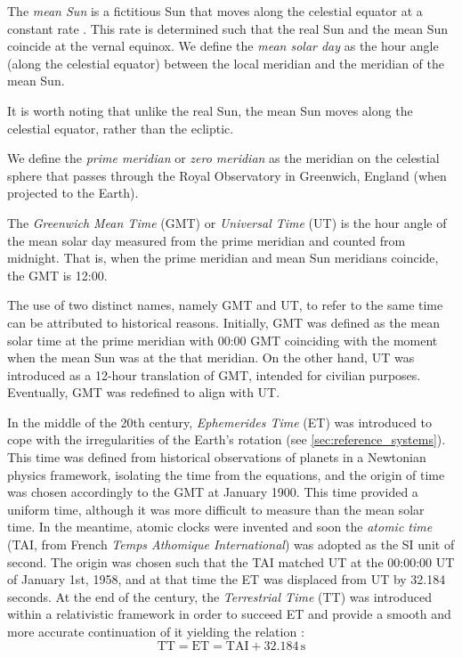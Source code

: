 \documentclass[../main.tex]{subfiles}
\begin{document}
\begin{definition}
  The \emph{mean Sun} is a fictitious Sun that moves along the celestial equator at a constant rate \cite{vallado}. This rate is determined such that the real Sun and the mean Sun coincide at the vernal equinox. We define the \emph{mean solar day} as the hour angle (along the celestial equator) between the local meridian and the meridian of the mean Sun.
\end{definition}
It is worth noting that unlike the real Sun, the mean Sun moves along the celestial equator, rather than the ecliptic.
\begin{definition}
  We define the \emph{prime meridian} or \emph{zero meridian} as the meridian on the celestial sphere that passes through the Royal Observatory in Greenwich, England (when projected to the Earth).
\end{definition}
\begin{definition}
  The \emph{Greenwich Mean Time} (GMT) or \emph{Universal Time} (UT) is the hour angle of the mean solar day measured from the prime meridian and counted from midnight. That is, when the prime meridian and mean Sun meridians coincide, the GMT is 12:00.
\end{definition}
The use of two distinct names, namely GMT and UT, to refer to the same time can be attributed to historical reasons. Initially, GMT was defined as the mean solar time at the prime meridian with 00:00 GMT coinciding with the moment when the mean Sun was at the that meridian. On the other hand, UT was introduced as a 12-hour translation of GMT, intended for civilian purposes. Eventually, GMT was redefined to align with UT.

In the middle of the 20th century, \emph{Ephemerides Time} (ET) was introduced to cope with the irregularities of the Earth's rotation (see \cref{sec:reference_systems}). This time was defined from historical observations of planets in a Newtonian physics framework, isolating the time from the equations, and the origin of time was chosen accordingly to the GMT at January 1900. This time provided a uniform time, although it was more difficult to measure than the mean solar time. In the meantime, atomic clocks were invented and soon the \emph{atomic time} (TAI, from French \emph{Temps Athomique International}) was adopted as the SI unit of second. The origin was chosen such that the TAI matched UT at the 00:00:00 UT of January 1st, 1958, and at that time the ET was displaced from UT by 32.184 seconds. At the end of the century, the \emph{Terrestrial Time} (TT) was introduced within a relativistic framework in order to succeed ET and provide a smooth and more accurate continuation of it yielding the relation \cite{montenbruck}:
\begin{equation}
  \text{TT}=\text{ET}= \text{TAI} + 32.184\,\mathrm{s}
\end{equation}
\end{document}
